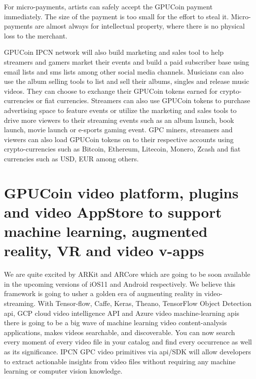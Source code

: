 \documentclass{article}
\begin{document}
For micro-payments, artists can safely accept the GPUCoin payment immediately. The size of the payment is too small for the effort to steal it. Micro-payments are almost always for intellectual property, where there is no physical loss to the merchant.

 GPUCoin IPCN network will also build marketing and sales tool to help streamers and gamers market their events and build a paid subscriber base using email lists and sms lists among other social media channels. 
Musicians can also use the album selling tools to list and sell their albums, singles and release music videos. They can choose to exchange their GPUCoin tokens earned for crypto-currencies or fiat currencies.
 Streamers can also use GPUCoin tokens to purchase advertising space to feature events or utilize the marketing and sales tools to drive more viewers to their streaming events such as an album launch, book launch, movie launch or e-sports gaming event. GPC miners, streamers and viewers can also load GPUCoin tokens on to their respective accounts using crypto-currencies such as Bitcoin, Ethereum, Litecoin, Monero, Zcash and fiat currencies such as USD, EUR among others.

\section{GPUCoin video platform, plugins and video AppStore to support machine learning, augmented reality, VR and video v-apps}
We are quite excited by ARKit and ARCore which are going to be soon available in the upcoming versions of iOS11 and Android respectively. We believe this framework is going to usher a golden era of augmenting reality in video-streaming. With Tensor-flow, Caffe, Keras, Theano, TensorFlow Object Detection api, GCP cloud video intelligence API and Azure video machine-learning apis there is going to be a big wave of machine learning video content-analysis applications, makes videos searchable, and discoverable. You can now search every moment of every video file in your catalog and find every occurrence as well as its significance. IPCN GPC video primitives via api/SDK will allow developers to extract actionable insights from video files without requiring any machine learning or computer vision knowledge. 
\end{document}
